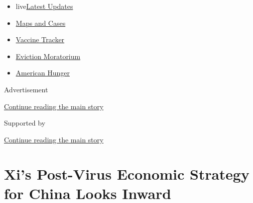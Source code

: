 \begin{itemize}
\tightlist
\item
  live\href{https://www.nytimes3xbfgragh.onion/2020/09/08/world/covid-19-coronavirus.html?name=styln-coronavirus-markets\&region=TOP_BANNER\&block=storyline_menu_recirc\&action=click\&pgtype=Article\&impression_id=d328da71-f1c6-11ea-b9e2-239474aa18e9\&variant=undefined}{Latest
  Updates}
\item
  \href{https://www.nytimes3xbfgragh.onion/interactive/2020/us/coronavirus-us-cases.html?name=styln-coronavirus-markets\&region=TOP_BANNER\&block=storyline_menu_recirc\&action=click\&pgtype=Article\&impression_id=d328da72-f1c6-11ea-b9e2-239474aa18e9\&variant=undefined}{Maps
  and Cases}
\item
  \href{https://www.nytimes3xbfgragh.onion/interactive/2020/science/coronavirus-vaccine-tracker.html?name=styln-coronavirus-markets\&region=TOP_BANNER\&block=storyline_menu_recirc\&action=click\&pgtype=Article\&impression_id=d3290180-f1c6-11ea-b9e2-239474aa18e9\&variant=undefined}{Vaccine
  Tracker}
\item
  \href{https://www.nytimes3xbfgragh.onion/2020/09/02/your-money/eviction-moratorium-covid.html?name=styln-coronavirus-markets\&region=TOP_BANNER\&block=storyline_menu_recirc\&action=click\&pgtype=Article\&impression_id=d3290181-f1c6-11ea-b9e2-239474aa18e9\&variant=undefined}{Eviction
  Moratorium}
\item
  \href{https://www.nytimes3xbfgragh.onion/interactive/2020/09/02/magazine/food-insecurity-hunger-us.html?name=styln-coronavirus-markets\&region=TOP_BANNER\&block=storyline_menu_recirc\&action=click\&pgtype=Article\&impression_id=d3290182-f1c6-11ea-b9e2-239474aa18e9\&variant=undefined}{American
  Hunger}
\end{itemize}

Advertisement

\protect\hyperlink{after-top}{Continue reading the main story}

Supported by

\protect\hyperlink{after-sponsor}{Continue reading the main story}

\hypertarget{xis-post-virus-economic-strategy-for-china-looks-inward}{%
\section{Xi's Post-Virus Economic Strategy for China Looks
Inward}\label{xis-post-virus-economic-strategy-for-china-looks-inward}}

